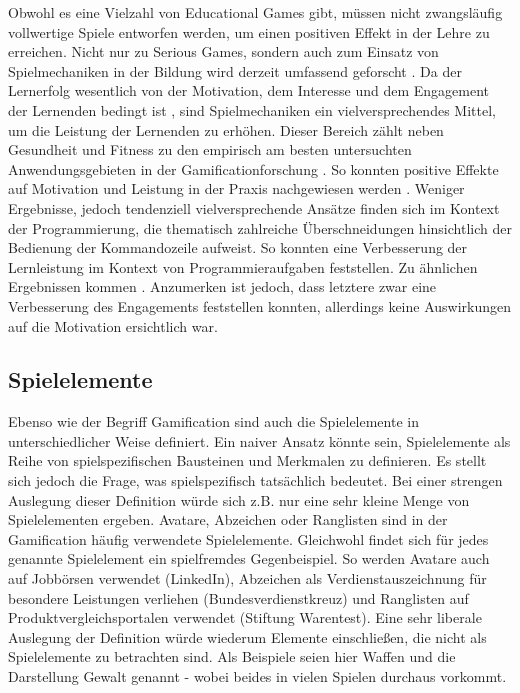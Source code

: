 Obwohl es eine Vielzahl von Educational Games gibt, müssen nicht zwangsläufig vollwertige Spiele entworfen werden, um einen positiven Effekt in der Lehre zu erreichen. Nicht nur zu Serious Games, sondern auch zum Einsatz von Spielmechaniken in der Bildung wird derzeit umfassend geforscht \cite{ibanez_gamification_2014,landers_enhancing_2017}. Da der Lernerfolg wesentlich von der Motivation, dem Interesse und dem Engagement der Lernenden bedingt ist \cite{astin_student_1984}, sind Spielmechaniken ein vielversprechendes Mittel, um die Leistung der Lernenden zu erhöhen.
Dieser Bereich zählt neben Gesundheit und Fitness zu den empirisch am besten untersuchten Anwendungsgebieten in der Gamificationforschung \cite{koivisto_rise_2019}.
So konnten positive Effekte auf Motivation und Leistung in der Praxis nachgewiesen werden \cite{ibanez_gamification_2014,hamzah_influence_2015,strmecki_gamification_2015}. Weniger Ergebnisse, jedoch tendenziell vielversprechende Ansätze finden sich im Kontext der Programmierung, die thematisch zahlreiche Überschneidungen hinsichtlich der Bedienung der Kommandozeile aufweist. So konnten  eine Verbesserung der Lernleistung im Kontext von Programmieraufgaben feststellen. Zu ähnlichen Ergebnissen kommen \cite{ortiz_gamification_2017}. Anzumerken ist jedoch, dass letztere zwar eine Verbesserung des Engagements feststellen konnten, allerdings keine Auswirkungen auf die Motivation ersichtlich war.



\subsection{Spielelemente}\label{gamelelements}
Ebenso wie der Begriff Gamification sind auch die Spielelemente in unterschiedlicher Weise definiert. Ein naiver Ansatz könnte sein, Spielelemente als Reihe von spielspezifischen Bausteinen und Merkmalen zu definieren. Es stellt sich jedoch die Frage, was spielspezifisch tatsächlich bedeutet. Bei einer strengen Auslegung dieser Definition würde sich z.B. nur eine sehr kleine Menge von Spielelementen ergeben. Avatare, Abzeichen oder Ranglisten sind in der Gamification häufig verwendete Spielelemente. Gleichwohl findet sich für jedes genannte Spielelement ein spielfremdes Gegenbeispiel. So werden Avatare auch auf Jobbörsen verwendet (LinkedIn), Abzeichen als Verdienstauszeichnung für besondere Leistungen verliehen (Bundesverdienstkreuz) und Ranglisten auf Produktvergleichsportalen verwendet (Stiftung Warentest). Eine sehr liberale Auslegung der Definition würde wiederum Elemente einschließen, die nicht als Spielelemente zu betrachten sind. Als Beispiele seien hier Waffen und die Darstellung Gewalt genannt - wobei beides in vielen Spielen durchaus vorkommt.


